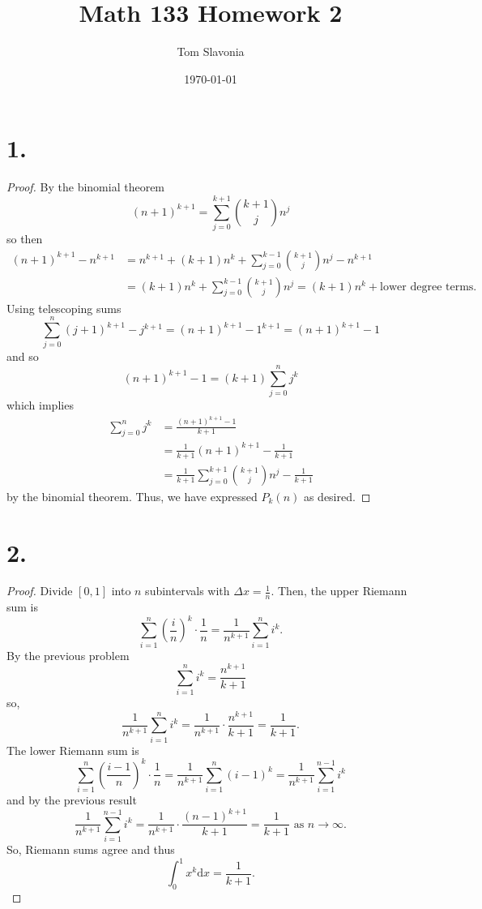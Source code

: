 \documentclass{article}
\title{Math 133 Homework 2}
\author{Tom Slavonia}
\date{\today}
\begin{document}
\maketitle
\section*{1.}
\begin{proof}
  By the binomial theorem 
  \[
  (n + 1)^{k + 1} = \sum\limits_{j = 0}^{k + 1}{k + 1 \choose j}n^j  
  \]
  so then
  \begin{align*}
    (n + 1)^{k + 1} - n^{k + 1} &= n^{k + 1} + (k + 1)n^k + \sum\limits_{j = 0}^{k -1 }{k + 1 \choose j}n^j - n^{k + 1} \\
    &= (k + 1)n^k + \sum\limits_{j = 0}^{k - 1} {k + 1 \choose j}n^j = (k + 1)n^k + \text{lower degree terms}.
  \end{align*}
  Using telescoping sums
  \[
  \sum\limits_{j = 0}^n (j + 1)^{k + 1} - j^{k +1} = (n + 1)^{k + 1} - 1^{k + 1} = (n + 1)^{k + 1} - 1  
  \]
  and so 
  \[
  (n + 1)^{k + 1} - 1 = (k + 1)\sum\limits_{j = 0}^n j^k  
  \]
  which implies
  \begin{align*}
    \sum\limits_{j = 0}^nj^k &= \frac{(n + 1)^{k + 1} - 1}{k + 1} \\
    &= \frac{1}{k + 1}(n + 1)^{k + 1} - \frac{1}{k + 1} \\
    &= \frac{1}{k + 1}\sum\limits_{j = 0}^{k + 1} {k+ 1 \choose j}n^j - \frac{1}{k + 1}
  \end{align*}
  by the binomial theorem. Thus, we have expressed $P_k(n)$ as desired. 
\end{proof}
\section*{2.}
\begin{proof}
Divide $[0, 1]$ into $n$ subintervals with $\Delta x = \frac{1}{n}$. Then, the upper Riemann sum is 
\[
 \sum\limits_{i = 1}^n \left(\frac{i}{n} \right)^k \cdot \frac{1}{n} = \frac{1}{n^{k + 1}} \sum\limits_{i = 1}^n i^k. 
\]
By the previous problem
\[
 \sum\limits_{i = 1}^ni^k = \frac{n^{k + 1}}{k + 1} 
\]
so, 
\[
 \frac{1}{n^{k + 1}}\sum\limits_{i = 1}^ni^k = \frac{1}{n^{k + 1}}\cdot \frac{n^{k + 1}}{k + 1} = \frac{1}{k + 1}. 
\]
The lower Riemann sum is 
\[
 \sum\limits_{i = 1}^n\left(\frac{i - 1}{n}\right)^k \cdot \frac{1}{n} = \frac{1}{n^{k + 1}}\sum\limits_{i = 1}^n(i - 1)^k = \frac{1}{n^{k + 1}}\sum\limits_{i = 1}^{n - 1}i^k 
\]
and by the previous result 
\[
  \frac{1}{n^{k + 1}}\sum\limits_{i = 1}^{n - 1}i^k = \frac{1}{n^{k + 1}}\cdot \frac{(n - 1)^{k + 1}}{k + 1} = \frac{1}{k + 1} \text{ as } n \to \infty.
\]
So, Riemann sums agree and thus 
\[
 \int_0^1x^k\mathrm{d}x = \frac{1}{k + 1}. 
\]
\end{proof}
\end{document}
